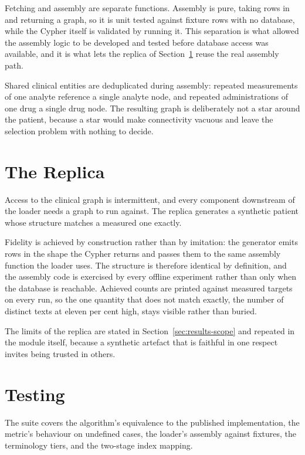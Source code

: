 Fetching and assembly are separate functions. Assembly is pure, taking rows in
and returning a graph, so it is unit tested against fixture rows with no
database, while the
Cypher itself is validated by running it. This separation is what allowed the
assembly logic to be developed and tested before database access was available,
and it is what lets the replica of Section~\ref{sec:implementation-replica} reuse
the real assembly path.

Shared clinical entities are deduplicated during assembly: repeated measurements
of one analyte reference a single analyte node, and repeated administrations of
one drug a single drug node. The resulting graph is deliberately not a star
around the patient, because a star would make connectivity vacuous and leave the
selection problem with nothing to decide.

\section{The Replica} \label{sec:implementation-replica}

Access to the clinical graph is intermittent, and every component downstream of
the loader needs a graph to run against. The replica generates a synthetic
patient whose structure matches a measured one exactly.

Fidelity is achieved by construction rather than by imitation: the generator
emits rows in the shape the Cypher returns and passes them to the same assembly
function the loader uses. The structure is therefore identical by definition, and
the assembly code is exercised by every offline experiment rather than only when
the database is reachable. Achieved counts are printed against measured targets
on every run, so the one quantity that does not match exactly, the number of
distinct texts at eleven per cent high, stays visible rather than buried.

The limits of the replica are stated in Section~\ref{sec:results-scope} and
repeated in the module itself, because a synthetic artefact that is faithful in
one respect invites being trusted in others.

\section{Testing} \label{sec:implementation-testing}

The suite covers the algorithm's equivalence to the published implementation, the
metric's behaviour on undefined cases, the loader's assembly against fixtures,
the terminology tiers, and the two-stage index mapping.

